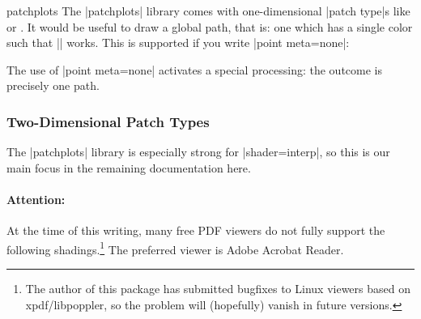 {\begin{pgfplotslibrary}{patchplots}
The |patchplots| library comes with one-dimensional |patch type|s like
 or . It would be useful
to draw a global path, that is: one which has a single color such that
|\closedcycle| works. This is supported if you write |point meta=none|:
%
\begin{codeexample}[]
\end{codeexample}
%
The use of |point meta=none| activates a special processing: the outcome is
precisely one path.


\subsubsection{Two-Dimensional Patch Types}
\label{sec:patchplots:twodim}

The |patchplots| library is especially strong for |shader=interp|, so this is
our main focus in the remaining documentation here.


\paragraph{Attention:}

At the time of this writing, many free PDF viewers do not fully support the
following shadings.\footnote{The author of this package has submitted bugfixes
to Linux viewers based on xpdf/libpoppler, so the problem will (hopefully)
vanish in future versions.} The preferred viewer is Adobe Acrobat Reader.


\end{pgfplotslibrary}}
